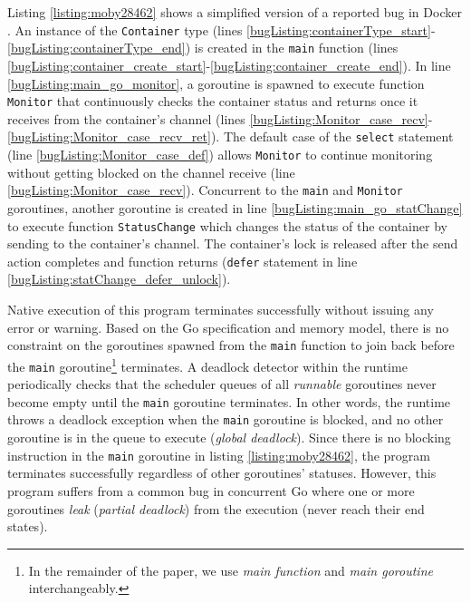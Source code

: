 

Listing \ref{listing:moby28462} shows a simplified version of a reported bug in Docker \cite{moby-28462-commit}.
%
An instance of the \texttt{Container} type (lines \ref{bugListing:containerType_start}-\ref{bugListing:containerType_end}) is created in the \texttt{main} function (lines \ref{bugListing:container_create_start}-\ref{bugListing:container_create_end}).
%
In line \ref{bugListing:main_go_monitor}, a goroutine is spawned to execute function \texttt{Monitor} that continuously checks the container status and returns once it receives from the container's channel (lines \ref{bugListing:Monitor_case_recv}-\ref{bugListing:Monitor_case_recv_ret}).
%
The default case of the \texttt{select} statement (line \ref{bugListing:Monitor_case_def}) allows \texttt{Monitor} to continue monitoring without getting blocked on the channel receive (line \ref{bugListing:Monitor_case_recv}).
%
Concurrent to the \texttt{main} and \texttt{Monitor} goroutines, another goroutine is created in line  \ref{bugListing:main_go_statChange} to execute function \texttt{StatusChange} which changes the status of the container by sending to the container's channel.
%
The container's lock is released after the send action completes and function returns (\texttt{defer} statement in line \ref{bugListing:statChange_defer_unlock}).
%


Native execution of this program terminates successfully without issuing any error or warning.
%
Based on the Go specification and memory model, there is no constraint on the goroutines spawned from the \texttt{main} function to join back before the \texttt{main} goroutine\footnote{In the remainder of the paper, we use \textit{main function} and \textit{main goroutine} interchangeably.} terminates.
%
A deadlock detector within the runtime periodically checks that the scheduler queues of all \textit{runnable} goroutines never become empty until the \texttt{main} goroutine terminates.
%
In other words, the runtime throws a deadlock exception when the \texttt{main} goroutine is blocked, and no other goroutine is in the queue to execute (\ie \textit{global deadlock}).
%
Since there is no blocking instruction in the \texttt{main} goroutine in listing \ref{listing:moby28462}, the program terminates successfully regardless of other goroutines' statuses.
%
However, this program suffers from a common bug in concurrent Go where one or more goroutines \textit{leak} (\ie \textit{partial deadlock}) from the execution (\ie never reach their end states).

